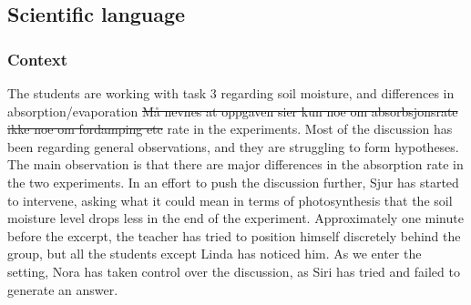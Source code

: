 \subsection{Scientific language}
\subsubsection*{Context}
The students are working with task 3 regarding soil moisture, and differences in absorption/evaporation \sout{Må nevnes at oppgaven sier kun noe om absorbsjonsrate ikke noe om fordamping etc} rate in the experiments. Most of the discussion has been regarding general observations, and they are struggling to form hypotheses. The main observation is that there are major differences in the absorption rate in the two experiments. In an effort to push the discussion further, Sjur has started to intervene, asking what it could mean in terms of photosynthesis that the soil moisture level drops less in the end of the experiment. Approximately one minute before the excerpt, the teacher has tried to position himself discretely behind the group, but all the students except Linda has noticed him. As we enter the setting, Nora has taken control over the discussion, as Siri has tried and failed to generate an answer. 

